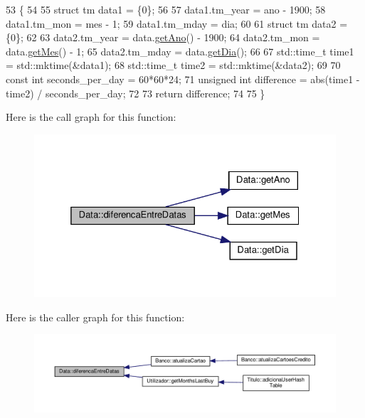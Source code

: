 \begin{DoxyCode}
53                                                         \{
54 
55     \textcolor{keyword}{struct }tm data1 = \{0\};
56 
57     data1.tm\_year = ano - 1900;
58     data1.tm\_mon = mes - 1;
59     data1.tm\_mday = dia;
60 
61     \textcolor{keyword}{struct }tm data2 = \{0\};
62 
63     data2.tm\_year = data.\hyperlink{classData_ae19e0d5af87f94f2809ba52dae69e15b}{getAno}() - 1900;
64     data2.tm\_mon = data.\hyperlink{classData_ab991d6a069c799930899b39bef9a4662}{getMes}() - 1;
65     data2.tm\_mday = data.\hyperlink{classData_a459536c9351759b5697ba25456d9bd70}{getDia}();
66 
67     std::time\_t time1 = std::mktime(&data1);
68     std::time\_t time2 = std::mktime(&data2);
69 
70     \textcolor{keyword}{const} \textcolor{keywordtype}{int} seconds\_per\_day = 60*60*24;
71     \textcolor{keywordtype}{unsigned} \textcolor{keywordtype}{int} difference = abs(time1 - time2) / seconds\_per\_day;
72 
73     \textcolor{keywordflow}{return} difference;
74 
75 \}
\end{DoxyCode}
Here is the call graph for this function\+:
\nopagebreak
\begin{figure}[H]
\begin{center}
\leavevmode
\includegraphics[width=325pt]{classData_a495d15dd0d90b595740f6e09fd0a2177_cgraph}
\end{center}
\end{figure}
Here is the caller graph for this function\+:
\nopagebreak
\begin{figure}[H]
\begin{center}
\leavevmode
\includegraphics[width=350pt]{classData_a495d15dd0d90b595740f6e09fd0a2177_icgraph}
\end{center}
\end{figure}
\mbox{\label{classData_ae19e0d5af87f94f2809ba52dae69e15b}} 
